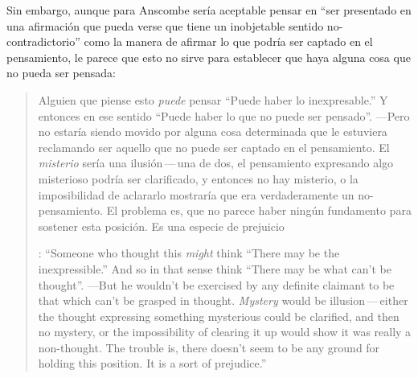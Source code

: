 Sin embargo, aunque para Anscombe sería aceptable pensar en ``ser presentado en una afirmación que pueda verse que tiene un inobjetable sentido no-contradictorio'' como la manera de afirmar lo que podría ser captado en el pensamiento, le parece que esto no sirve para establecer que haya alguna cosa que no pueda ser pensada: \blockquote[{\cite[8]{anscombe1981parmenides:pmc}}: \enquote{Someone who thought this \emph{might} think ``There may be the inexpressible.'' And so in that sense think ``There may be what can't be thought''. ---But he wouldn't be exercised by any definite claimant to be that which can't be grasped in thought. \emph{Mystery} would be illusion\,---\,either the thought expressing something mysterious could be clarified, and then no mystery, or the impossibility of clearing it up would show it was really a non-thought. The trouble is, there doesn't seem to be any ground for holding this position. It is a sort of prejudice.}]{Alguien que piense esto \emph{puede} pensar ``Puede haber lo inexpresable.'' Y entonces en ese sentido ``Puede haber lo que no puede ser pensado''. ---Pero no estaría siendo movido por alguna cosa determinada que le estuviera reclamando ser aquello que no puede ser captado en el pensamiento. El \emph{misterio} sería una ilusión\,---\,una de dos, el pensamiento expresando algo misterioso podría ser clarificado, y entonces no hay misterio, o la imposibilidad de aclararlo mostraría que era verdaderamente un no-pensamiento. El problema es, que no parece haber ningún fundamento para sostener esta posición. Es una especie de prejuicio}.

